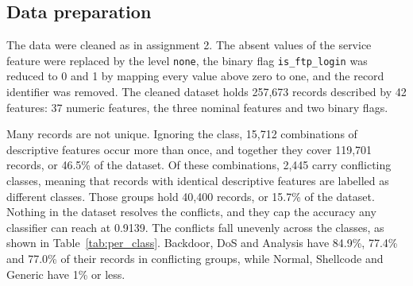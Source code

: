 \documentclass[conference,10pt]{IEEEtran}
\begin{document}
\subsection{Data preparation}
\label{subsec:impl_data}

The data were cleaned as in assignment 2. The absent values of the service
feature were replaced by the level \texttt{none}, the binary flag
\texttt{is\_ftp\_login} was reduced to 0 and 1 by mapping every value above
zero to one, and the record identifier was removed. The cleaned dataset
holds 257,673 records described by 42 features: 37 numeric features, the
three nominal features and two binary flags.

Many records are not unique. Ignoring the class, 15,712 combinations of
descriptive features occur more than once, and together they cover 119,701
records, or 46.5\% of the dataset. Of these combinations, 2,445 carry
conflicting classes, meaning that records with identical descriptive
features are labelled as different classes. Those groups hold 40,400
records, or 15.7\% of the dataset. Nothing in the dataset resolves the
conflicts, and they cap the accuracy any classifier can reach at 0.9139. The
conflicts fall unevenly across the classes, as shown in Table~\ref{tab:per_class}.
Backdoor, DoS and Analysis have 84.9\%, 77.4\% and 77.0\% of their records
in conflicting groups, while Normal, Shellcode and Generic have 1\% or
less.
\end{document}
